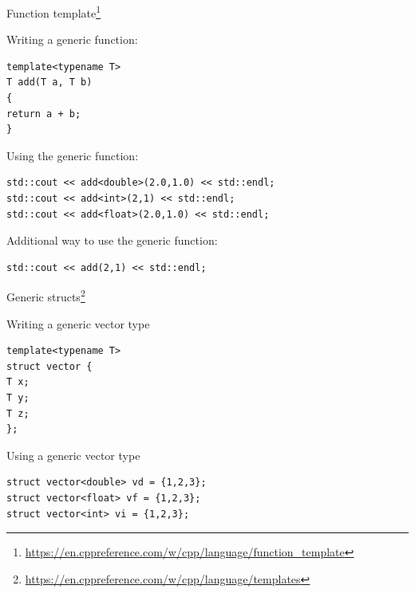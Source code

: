 \documentclass[12pt,t]{beamer}
\begin{document}
\begin{frame}[fragile]{Function template\footnote{\tiny\url{https://en.cppreference.com/w/cpp/language/function_template}}}

\begin{block}{Writing a generic function:}
\begin{lstlisting}
template<typename T>
T add(T a, T b)
{
return a + b;
}
\end{lstlisting}
\end{block}

\begin{block}{Using the generic function:}
\begin{lstlisting}
std::cout << add<double>(2.0,1.0) << std::endl;
std::cout << add<int>(2,1) << std::endl;
std::cout << add<float>(2.0,1.0) << std::endl;
\end{lstlisting}
\end{block}

\begin{block}{Additional way to use the generic function:}
\begin{lstlisting}
std::cout << add(2,1) << std::endl;
\end{lstlisting}
\end{block}

\end{frame}


\begin{frame}[fragile]{Generic structs\footnote{\tiny\url{https://en.cppreference.com/w/cpp/language/templates}}}

\begin{block}{Writing a generic vector type}
\begin{lstlisting}
template<typename T>
struct vector {
T x;
T y;
T z;
};
\end{lstlisting}
\end{block}

\begin{block}{Using a generic vector type}
\begin{lstlisting}
struct vector<double> vd = {1,2,3};
struct vector<float> vf = {1,2,3};
struct vector<int> vi = {1,2,3};
\end{lstlisting}
\end{block}
\end{frame}
\end{document}
